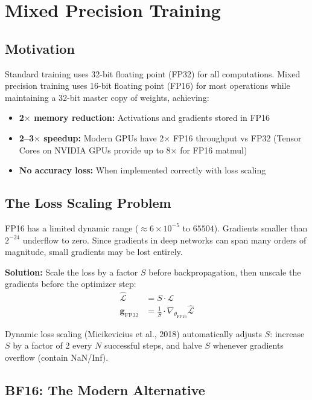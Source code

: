\section{Mixed Precision Training}

\subsection{Motivation}

Standard training uses 32-bit floating point (FP32) for all computations. Mixed precision training uses 16-bit floating point (FP16) for most operations while maintaining a 32-bit master copy of weights, achieving:
\begin{itemize}
    \item \textbf{2$\times$ memory reduction:} Activations and gradients stored in FP16
    \item \textbf{2--3$\times$ speedup:} Modern GPUs have 2$\times$ FP16 throughput vs FP32 (Tensor Cores on NVIDIA GPUs provide up to 8$\times$ for FP16 matmul)
    \item \textbf{No accuracy loss:} When implemented correctly with loss scaling
\end{itemize}

\subsection{The Loss Scaling Problem}

FP16 has a limited dynamic range ($\approx 6 \times 10^{-5}$ to $65504$). Gradients smaller than $2^{-24}$ underflow to zero. Since gradients in deep networks can span many orders of magnitude, small gradients may be lost entirely.

\textbf{Solution:} Scale the loss by a factor $S$ before backpropagation, then unscale the gradients before the optimizer step:
\begin{align}
\hat{\mathcal{L}} &= S \cdot \mathcal{L} \\
\mathbf{g}_{\text{FP32}} &= \frac{1}{S} \cdot \nabla_{\theta_{\text{FP16}}} \hat{\mathcal{L}}
\end{align}

Dynamic loss scaling (Micikevicius et al., 2018) automatically adjusts $S$: increase $S$ by a factor of 2 every $N$ successful steps, and halve $S$ whenever gradients overflow (contain NaN/Inf).

\subsection{BF16: The Modern Alternative}

